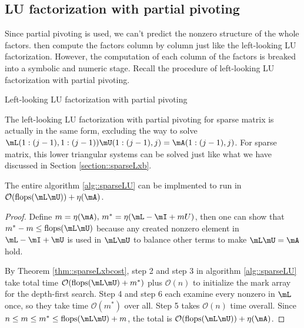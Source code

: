 \subsection{LU factorization with partial pivoting}
\begin{alg}
    \label{alg::sparseLU}
    Since partial pivoting is used, we can't predict the 
    nonzero structure of the whole factors. \cite{Gilbert1988} 
    then compute the factors column by column just like the 
    left-looking LU factorization. However, the computation 
    of each column of the factors is breaked into a symbolic 
    and numeric stage. Recall the procedure of left-looking LU factorization with partial pivoting.
    \IncMargin{1em}
    \begin{algorithm}[H]
        \caption{Left-looking LU factorization with partial 
        pivoting}


        \BlankLine
    \end{algorithm}
    \DecMargin{1em}
    The left-looking LU factorization with partial pivoting 
    for sparse matrix is actually in the same form, excluding 
    the way to solve $\mL(1:(j-1),1:(j-1))\mU(1:(j-1),j)=
    \mA(1:(j-1),j)$. For sparse matrix, this lower triangular 
    systems can be solved just like what we have discussed in 
    Section \ref{section::sparseLxb}.
\end{alg}

\begin{thm}
    The entire algorithm \ref{alg::sparseLU} can be implmented 
    to run in $\mathcal{O}(\mathrm{flops}(\mL\mU))+\eta(\mA)$.
\end{thm}
\begin{proof}
    Define $m=\eta(\mA),\,m^*=\eta(\mL-\mI+mU)$, then one can 
    show that $m^*-m\leq \mathrm{flops}(\mL\mU)$ because any 
    created nonzero element in $\mL-\mI+\mU$ is used in 
    $\mL\mU$ to balance other terms to make $\mL\mU=\mA$ hold. 
    
    By Theorem \ref{thm::sparseLxbcost}, step 2 and step 3 in 
    algorithm \ref{alg::sparseLU} take total time $\mathcal{O}
    (\mathrm{flops}(\mL\mU)+m^*)$ plus $\mathcal{O}(n)$ to 
    initialize the mark array for the depth-first search. Step 
    4 and step 6 each examine every nonzero in $\mL$ once, so 
    they take time $\mathcal{O}(m^*)$ over all. Step 5 takes 
    $\mathcal{O}(n)$ time overall. Since $n\leq m\leq m^*\leq 
    \mathrm{flops}(\mL\mU)+m$, the total is $\mathcal{O}
    (\mathrm{flops}(\mL\mU))+\eta(\mA)$.
\end{proof}